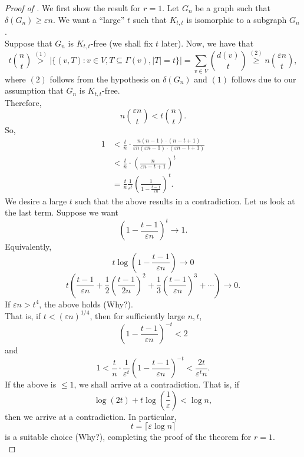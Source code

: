 \documentclass{article}
\begin{document}
			\begin{proof}[Proof of ]
				We first show the result for $r=1$. Let $G_n$ be a graph such that $\delta(G_n) \ge \varepsilon n$. We want a ``large'' $t$ such that $K_{t,t}$ is isomorphic to a subgraph $G_n$.\\
				Suppose that $G_n$ is $K_{t,t}$-free (we shall fix $t$ later).
				Now, we have that
				\[ t \binom{n}{t} \stackrel{(1)}{>} |\{(v,T) : v\in V, T \subseteq \Gamma(v), |T|=t\}| = \sum_{v\in V} \binom{d(v)}{t} \stackrel{(2)}{\ge} n \binom{\varepsilon n}{t}, \]
				where $(2)$ follows from the hypothesis on $\delta(G_n)$ and $(1)$ follows due to our assumption that $G_n$ is $K_{t,t}$-free.\\
				Therefore,
				\[ n\binom{\varepsilon n}{t} < t \binom{n}{t}. \]
				So,
				\begin{align*}
					1 &< \frac{t}{n} \cdot \frac{n(n-1)\cdot (n-t+1)}{\varepsilon n(\varepsilon n-1)\cdot (\varepsilon n-t+1)} \\
					&< \frac{t}{n} \cdot \left(\frac{n}{\varepsilon n-t+1}\right)^t \\
					&= \frac{t}{n} \frac{1}{\varepsilon^t} \left(\frac{1}{1 - \frac{t-1}{\varepsilon n}}\right)^t.
				\end{align*}
				We desire a large $t$ such that the above results in a contradiction.
				Let us look at the last term. Suppose we want
				\[ \left(1 - \frac{t-1}{\varepsilon n}\right)^t \to 1. \]
				Equivalently,
				\[ t \log\left(1 - \frac{t-1}{\varepsilon n}\right) \to 0 \]
				\[ t \left(\frac{t-1}{\varepsilon n} + \frac{1}{2}\left(\frac{t-1}{2n}\right)^2 + \frac{1}{3} \left(\frac{t-1}{\varepsilon n}\right)^3 + \cdots\right) \to 0. \]
				If $\varepsilon n > t^4$, the above holds (Why?).\\
				That is, if $t < (\varepsilon n)^{1/4}$, then for sufficiently large $n, t$,
				\[ \left(1 - \frac{t-1}{\varepsilon n}\right)^{-t} < 2 \]
				and
				\[ 1 < \frac{t}{n} \cdot \frac{1}{\varepsilon^t} \left(1 - \frac{t-1}{\varepsilon n}\right)^{-t} < \frac{2t}{\varepsilon^t n}. \]
				If the above is $\le 1$, we shall arrive at a contradiction. That is, if
				\[ \log(2t) + t \log\left(\frac{1}{\varepsilon}\right) < \log n, \]
				then we arrive at a contradiction. In particular,
				\[ t = \lceil \varepsilon \log n \rceil \]
				is a suitable choice (Why?), completing the proof of the theorem for $r=1$.\\


\end{proof}
\end{document}
